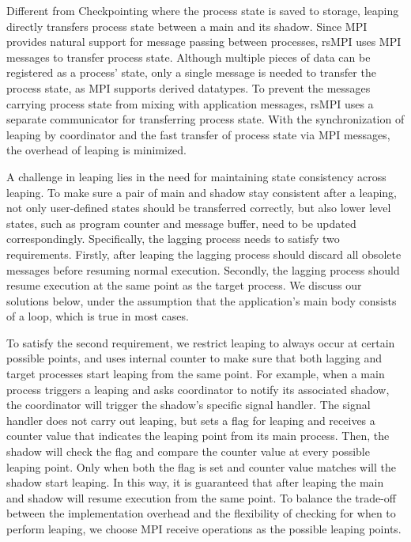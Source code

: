Different from Checkpointing where the process state is saved to storage, leaping directly transfers process state between a main and its shadow. 
Since MPI provides natural support for message passing between processes, 
rsMPI uses MPI messages to transfer process state. Although multiple pieces of data can be registered as a process' state, only a single message is needed to transfer the process state, as MPI supports derived datatypes. To prevent the messages carrying process state from mixing with application messages, rsMPI uses a separate communicator for transferring process state. With the synchronization of leaping by coordinator and the fast transfer of process state via MPI messages, the overhead of leaping is minimized. 

A challenge in leaping lies in the need for maintaining state consistency across leaping. To make sure a pair of main and shadow stay consistent after a leaping, not only user-defined states should be transferred correctly, but also lower level states, such as program counter and message buffer, need to be updated correspondingly. Specifically, the lagging process needs to satisfy two requirements. 
Firstly, after leaping the lagging process should discard all obsolete messages before resuming normal execution. Secondly, the lagging process should resume execution at the same point as the target process. We discuss our solutions below, under the assumption that the application's main body consists of a loop, which is true in most cases. 

To satisfy the second requirement, we restrict leaping to always occur at certain possible points, and uses internal counter to make sure that both lagging and target processes start leaping from the same point. For example, when a main process triggers a leaping and asks coordinator to notify its associated shadow, the coordinator will trigger the shadow's specific signal handler. The signal handler does not carry out leaping, but sets a flag for leaping and receives a counter value that indicates the leaping point from its main process. Then, the shadow will check the flag and compare the counter value at every possible leaping point. Only when both the flag is set and counter value matches will the shadow start leaping. In this way, it is guaranteed that after leaping the main and shadow will resume execution from the same point. To balance the trade-off between the implementation overhead and the flexibility of checking for when to perform leaping, we choose MPI receive operations as the possible leaping points. 

